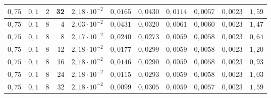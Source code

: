\begin{tabular}{cccrccccccc}
$0{,}75$ & $0{,}1$ & $2$ & 32 & $2{,}18 \cdot 10^{-2}$ & $0{,}0165$ & $0{,}0430$ & $0{,}0114$ & $0{,}0057$ & $0{,}0023$ & $1{,}59$ \\
\midrule
$0{,}75$ & $0{,}1$ & $8$ & 4 & $2{,}03 \cdot 10^{-2}$ & $0{,}0431$ & $0{,}0320$ & $0{,}0061$ & $0{,}0060$ & $0{,}0023$ & $1{,}47$ \\
$0{,}75$ & $0{,}1$ & $8$ & 8 & $2{,}17 \cdot 10^{-2}$ & $0{,}0240$ & $0{,}0273$ & $0{,}0059$ & $0{,}0058$ & $0{,}0023$ & $0{,}64$ \\
$0{,}75$ & $0{,}1$ & $8$ & 12 & $2{,}18 \cdot 10^{-2}$ & $0{,}0177$ & $0{,}0299$ & $0{,}0059$ & $0{,}0058$ & $0{,}0023$ & $1{,}20$ \\
$0{,}75$ & $0{,}1$ & $8$ & 16 & $2{,}18 \cdot 10^{-2}$ & $0{,}0146$ & $0{,}0290$ & $0{,}0059$ & $0{,}0058$ & $0{,}0023$ & $0{,}93$ \\
$0{,}75$ & $0{,}1$ & $8$ & 24 & $2{,}18 \cdot 10^{-2}$ & $0{,}0115$ & $0{,}0293$ & $0{,}0059$ & $0{,}0058$ & $0{,}0023$ & $1{,}03$ \\
$0{,}75$ & $0{,}1$ & $8$ & 32 & $2{,}18 \cdot 10^{-2}$ & $0{,}0099$ & $0{,}0305$ & $0{,}0059$ & $0{,}0057$ & $0{,}0023$ & $1{,}59$ \\
\bottomrule
\end{tabular}
